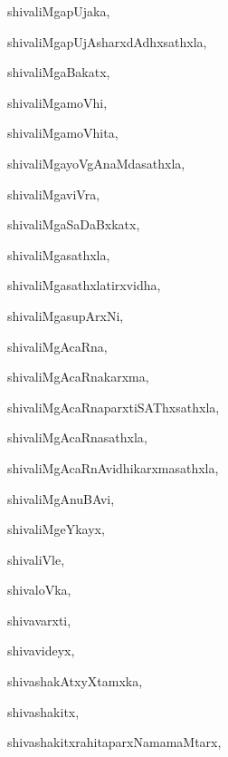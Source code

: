 \begin{multicols}{3}
{\noindent
{shivaliMgapUjaka}, \pageref{shivaliMgapUjaka}

\noindent
{shivaliMgapUjAsharxdAdhxsathxla}, \pageref{shivaliMgapUjAsharxdAdhxsathxla}

\noindent
{shivaliMgaBakatx}, \pageref{shivaliMgaBakatx}

\noindent
{shivaliMgamoVhi}, \pageref{shivaliMgamoVhi}

\noindent
{shivaliMgamoVhita}, \pageref{shivaliMgamoVhita}

\noindent
{shivaliMgayoVgAnaMdasathxla}, \pageref{shivaliMgayoVgAnaMdasathxla}

\noindent
{shivaliMgaviVra}, \pageref{shivaliMgaviVra}

\noindent
{shivaliMgaSaDaBxkatx}, \pageref{shivaliMgaSaDaBxkatx}

\noindent
{shivaliMgasathxla}, \pageref{shivaliMgasathxla}

\noindent
{shivaliMgasathxlatirxvidha}, \pageref{shivaliMgasathxlatirxvidha}

\noindent
{shivaliMgasupArxNi}, \pageref{shivaliMgasupArxNi}

\noindent
{shivaliMgAcaRna}, \pageref{shivaliMgAcaRna}

\noindent
{shivaliMgAcaRnakarxma}, \pageref{shivaliMgAcaRnakarxma}

\noindent
{shivaliMgAcaRnaparxtiSAThxsathxla}, \pageref{shivaliMgAcaRnaparxtiSAThxsathxla}

\noindent
{shivaliMgAcaRnasathxla}, \pageref{shivaliMgAcaRnasathxla}

\noindent
{shivaliMgAcaRnAvidhikarxmasathxla}, \pageref{shivaliMgAcaRnAvidhikarxmasathxla}

\noindent
{shivaliMgAnuBAvi}, \pageref{shivaliMgAnuBAvi}

\noindent
{shivaliMgeYkayx}, \pageref{shivaliMgeYkayx}

\noindent
{shivaliVle}, \pageref{shivaliVle}

\noindent
{shivaloVka}, \pageref{shivaloVka}

\noindent
{shivavarxti}, \pageref{shivavarxti}

\noindent
{shivavideyx}, \pageref{shivavideyx}

\noindent
{shivashakAtxyXtamxka}, \pageref{shivashakAtxyXtamxka}

\noindent
{shivashakitx}, \pageref{shivashakitx}

\noindent
{shivashakitxrahitaparxNamamaMtarx}, \pageref{shivashakitxrahitaparxNamamaMtarx}

}
\end{multicols}
